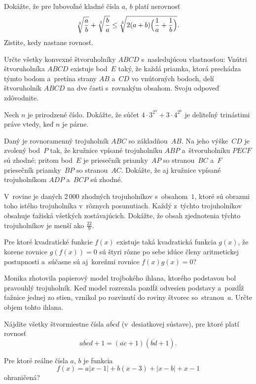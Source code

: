 {%
Dokážte, že pre ľubovoľné kladné čísla $a$, $b$ platí nerovnosť
$$
\root3\of{a\over b}+
\root3\of{b\over a}\le
\root3\of{2(a+b)\Bigl(\frac1a+\frac1b\Bigr)}.
$$
Zistite, kedy nastane rovnosť.}

{%
Určte všetky konvexné štvoruholníky $ABC\!D$ s~nasledujúcou
vlastnosťou: Vnútri štvoruholníka $ABC\!D$ existuje bod~$E$ taký,
že každá priamka, ktorá prechádza týmto bodom a~pretína strany $AB$
a~$C\!D$ vo vnútorných bodoch, delí štvoruholník $ABC\!D$ na dve časti
s~rovnakým obsahom. Svoju odpoveď zdôvodnite.}

{%
Nech $n$ je prirodzené číslo. Dokážte, že súčet
$
4\cdot3^{2^n}+3\cdot4^{2^n}
$
je deliteľný trinástimi práve vtedy, keď $n$ je párne.}

{%
Daný je rovnoramenný trojuholník $ABC$ so základňou~$AB$. Na jeho výške~$CD$
je zvolený bod~$P$ tak, že kružnice vpísané trojuholníku $ABP$
a~štvoruholníku $PECF$ sú zhodné; pritom bod~$E$ je
priesečník priamky~$AP$ so stranou~$BC$ a~$F$ priesečník priamky~$BP$
so stranou~$AC$. Dokážte, že aj kružnice vpísané trojuholníkom $ADP$
a~$BCP$ sú zhodné.}

{%
V~rovine je daných 2\,000 zhodných trojuholníkov s~obsahom~$1$, ktoré
sú obrazmi toho istého trojuholníka v~rôznych posunutiach. Každý
z~týchto trojuholníkov obsahuje ťažiská všetkých zostávajúcich. Dokážte, že
obsah zjednotenia týchto trojuholníkov je menší ako $\frac{22}9$.}

{%
Pre ktoré kvadratické funkcie $f(x)$ existuje taká kvadratická
funkcia $g(x)$, že korene rovnice $g\left(f(x)\right)=0$ sú štyri
rôzne po sebe idúce členy aritmetickej postupnosti a~súčasne sú
aj~koreňmi rovnice $f(x)g(x)=0$?}

{%
Monika zhotovila papierový model trojbokého ihlana, ktorého
podstavou bol pravouhlý trojuholník. Keď model rozrezala pozdĺž odvesien
podstavy a~pozdĺž ťažnice jednej zo stien, vznikol po rozvinutí do
roviny štvorec so~stranou~$a$.
Určte objem tohto ihlana.}

{%
Nájdite všetky štvormiestne čísla $\overline{abcd}$ (v~desiatkovej
sústave), pre ktoré platí rovnosť
$$
\overline{abcd}+1=(\overline{ac}+1)(\overline{bd}+1).
$$}

{%
Pre ktoré reálne čísla $a$, $b$ je funkcia
$$
f(x)=a|x-1|+b(x-3)+|x-b|+x-1
$$
ohraničená?}

